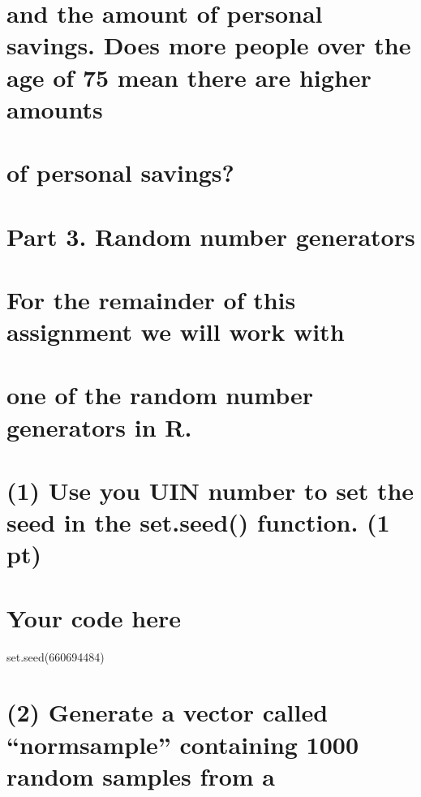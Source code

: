 \documentclass[]{article}
\begin{document}
\section{and the amount of personal savings. Does more people over the
age of 75 mean there are higher
amounts}\label{and-the-amount-of-personal-savings.-does-more-people-over-the-age-of-75-mean-there-are-higher-amounts}

\section{of personal savings?}\label{of-personal-savings}

\section{Part 3. Random number
generators}\label{part-3.-random-number-generators}

\section{For the remainder of this assignment we will work
with}\label{for-the-remainder-of-this-assignment-we-will-work-with}

\section{one of the random number generators in
R.}\label{one-of-the-random-number-generators-in-r.}

\section{(1) Use you UIN number to set the seed in the set.seed()
function. (1
pt)}\label{use-you-uin-number-to-set-the-seed-in-the-set.seed-function.-1-pt}

\section{Your code here}\label{your-code-here}

set.seed(660694484)

\section{\texorpdfstring{(2) Generate a vector called ``normsample''
containing 1000 random samples from
a}{(2) Generate a vector called normsample containing 1000 random samples from a}}\label{generate-a-vector-called-normsample-containing-1000-random-samples-from-a}
\end{document}
